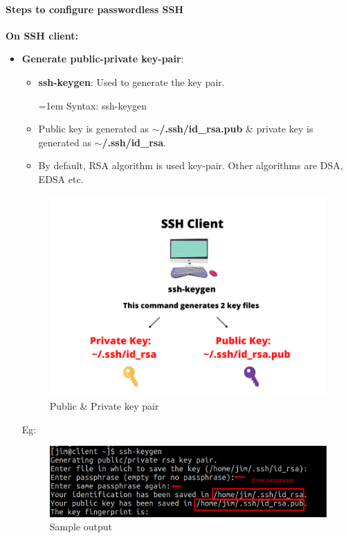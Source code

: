 \begin{flushleft}
\begin{itemize}
\end{itemize}

\newpage
\paragraph{Steps to configure passwordless SSH}

\textbf{On SSH client:}
\begin{itemize}
	\item \textbf{Generate public-private key-pair}:
	\begin{itemize}
		\item \textbf{ssh-keygen}: Used to generate the key pair.
		\begin{tcolorbox}[breakable,notitle,boxrule=0pt,colback=pink,colframe=pink]
			\color{black}
			\font=1em
			Syntax: ssh-keygen
			\font=4pt
		\end{tcolorbox}
		
		\item Public key is generated as \textbf{$\sim$/.ssh/id\_rsa.pub} \& private key is generated as \textbf{$\sim$/.ssh/id\_rsa}.
		\item By default, RSA algorithm is used key-pair. Other algorithms are DSA, EDSA etc.
	\end{itemize}

	\begin{figure}[h!]
		\centering
		\includegraphics[scale=0.4]{content/chapter19/images/ssh0.png}
		\caption{Public \& Private key pair}
		\label{fig:stage5563}
	\end{figure}
	
	Eg:
	\begin{figure}[h!]
		\centering
		\includegraphics[scale=0.2]{content/chapter19/images/ssh9.png}
		\caption{Sample output}
		\label{fig:stage7}
	\end{figure}
	

\end{itemize}
\end{flushleft}
